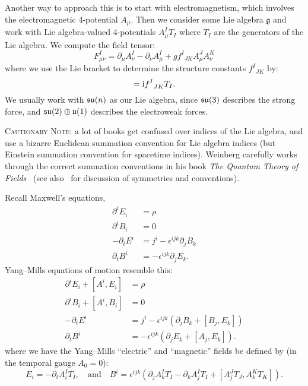 Another way to approach this is to start with electromagnetism, which
involves the electromagnetic 4-potential $A_{\mu}$. Then we consider
some Lie algebra $\mathfrak{g}$ and work with Lie algebra-valued
4-potentials $A_{\mu}^{I}T_{I}$ where $T_{I}$ are the generators of the
Lie algebra. We compute the field tensor:
\begin{equation}
F_{\mu\nu}^{I} = \partial_{\mu}A^{I}_{\nu} - \partial_{\nu}A^{I}_{\mu}
+g{f^{I}}_{JK}A^{J}_{\mu}A^{K}_{\nu}
\end{equation}
where we use the Lie bracket to determine the structure constants
${f^{I}}_{JK}$ by:
\begin{equation}
[T_{J}, T_{K}] = \I {f^{I}}_{JK}T_{I}.
\end{equation}
We usually work with $\mathfrak{su}(n)$ as our Lie algebra, since $\mathfrak{su}(3)$
describes the strong force, and $\mathfrak{su}(2)\oplus\mathfrak{u}(1)$ describes
the electroweak forces.

\textsc{Cautionary Note}: a lot of books get confused over indices of
the Lie algebra, and use a bizarre Euclidean summation convention for
Lie algebra indices (but Einstein summation convention for spacetime
indices). Weinberg carefully works through the correct summation
conventions in his book \textit{The Quantum Theory of Fields}~\cite[\S15.1]{Weinberg:1996kr}
(see also~\cite[\S2.2]{Weinberg:1995mt} for discussion of symmetries and
conventions).

Recall Maxwell's equations,
\begin{subequations}
\begin{align}
\partial^{i}E_{i} &= \rho\\
\partial^{i}B_{i} &= 0\\
-\partial_{t}E^{i} &= j^{i} -\epsilon^{ijk}\partial_{j}B_{k}\\
\partial_{t}B^{i} &= -\epsilon^{ijk}\partial_{j}E_{k}.
\end{align}
\end{subequations}
Yang--Mills equations of motion resemble this:
\begin{subequations}
\begin{align}
\partial^{i}E_{i} + [A^{i},E_{i}] &= \rho\\
\partial^{i}B_{i} + [A^{i},B_{i}] &= 0\\
-\partial_{t}E^{i} &= j^{i} -\epsilon^{ijk}(\partial_{j}B_{k} + [B_{j},E_{k}])\\
\partial_{t}B^{i} &= -\epsilon^{ijk}(\partial_{j}E_{k} + [A_{j},E_{k}]).
\end{align}
\end{subequations}
where we have the Yang--Mills ``electric'' and ``magnetic'' fields be
defined by (in the temporal gauge $A_{0}=0$):
\begin{equation}
E_{i} = -\partial_{t}A_{i}^{I}T_{I},\quad\mbox{and}\quad
B^{i} = \epsilon^{ijk}(\partial_{j}A_{k}^{I}T_{I} - \partial_{k}A_{j}^{I}T_{I}
+ [A_{j}^{J}T_{J}, A_{k}^{K}T_{K}]).
\end{equation}

